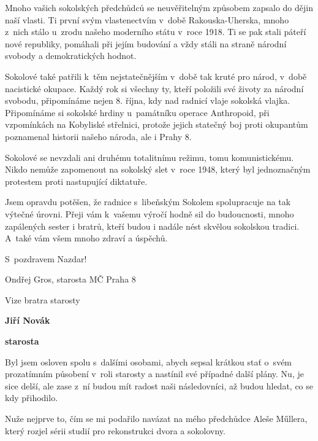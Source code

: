 \documentclass[11pt]{article}
\begin{document}
{\sloppy
Mnoho vašich sokolských předchůdců se neuvěřitelným způsobem zapsalo do dějin naší vlasti. Ti první svým vlastenectvím v~době Rakouska-Uherska, mnoho z~nich stálo u~zrodu našeho moderního státu v~roce 1918. Ti se pak stali páteří nové republiky, pomáhali při jejím budování a vždy stáli na straně národní svobody a demokratických hodnot.}

Sokolové také patřili k~těm nejstatečnějším v~době tak kruté pro národ, v~době nacistické okupace. Každý rok si všechny ty, kteří položili své životy za národní svobodu, připomínáme nejen 8. října, kdy nad radnicí vlaje sokolská vlajka. Připomínáme si sokolské hrdiny u~památníku operace Anthropoid, při vzpomínkách na Kobyliské střelnici, protože jejich statečný boj proti okupantům poznamenal historii našeho národa, ale i Prahy 8.

Sokolové se nevzdali ani druhému totalitnímu režimu, tomu komunistickému. Nikdo nemůže zapomenout na sokolský slet v~roce 1948, který byl jednoznačným protestem proti nastupující diktatuře. 

Jsem opravdu potěšen, že radnice s~libeňským Sokolem spolupracuje na tak výtečné úrovni. Přeji vám k~vašemu výročí hodně sil do budoucnosti, mnoho zapálených sester i bratrů, kteří budou i nadále nést skvělou sokolskou tradici. A~také vám všem mnoho zdraví a úspěchů. 

S~pozdravem Nazdar!

\hfill Ondřej Gros, starosta MČ Praha 8

\clearpage


\pagestyle{uvodnik}

\setlength{\columnsep}{-2.5cm}
\begin{multicols}{2}
 {\huge \tyrs \noindent Vize bratra starosty}

 \columnbreak

 \vspace*{-14pt}

 {\hfill\textbf{Jiří Novák}}
 
 {\hfill\textbf{starosta}}
\end{multicols}

\noindent
Byl jsem osloven spolu s~dalšími osobami, abych sepsal krátkou stať o~svém prozatímním působení v~roli starosty a nastínil své případné další plány. Nu, je sice delší, ale zase z~ní budou mít radost naši následovníci, až budou hledat, co se kdy přihodilo.

Nuže nejprve to, čím se mi podařilo navázat na mého předchůdce Aleše Műllera, který rozjel sérii studií pro rekonstrukci dvora a sokolovny. 
 
\end{document}
